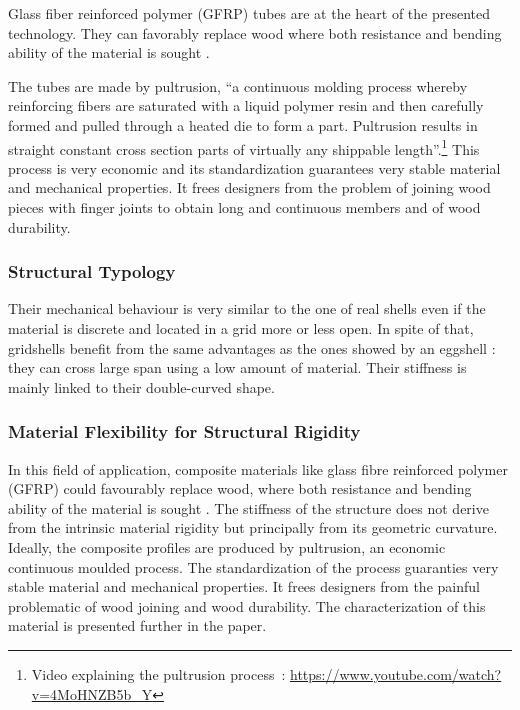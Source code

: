 Glass fiber reinforced polymer (GFRP) tubes are at the heart of the presented technology. They can favorably replace wood where both resistance and bending ability of the material is sought \cite{Douthe2010}. 

The tubes are made by pultrusion, \enquote{a continuous molding process whereby reinforcing fibers are saturated with a liquid polymer resin and then carefully formed and pulled through a heated die to form a part. Pultrusion results in straight constant cross section parts of virtually any shippable length}.\footnote{Video explaining the pultrusion process~: \url{https://www.youtube.com/watch?v=4MoHNZB5b_Y}} This process is very economic and its standardization guarantees very stable material and mechanical properties. It frees designers from the problem of joining wood pieces with finger joints to obtain long and continuous members and of wood durability. 


\subsubsection{Structural Typology}
Their mechanical behaviour is very similar to the one of real shells even if the material is discrete and located in a grid more or less open. In spite of that, gridshells benefit from the same advantages as the ones showed by an eggshell : they can cross large span using a low amount of material. Their stiffness is mainly linked to their double-curved shape.


\subsubsection{Material Flexibility for Structural Rigidity}
In this field of application, composite materials like glass fibre reinforced polymer (GFRP) could favourably replace wood, where both resistance and bending ability of the material is sought \cite{Douthe2010}. The stiffness of the structure does not derive from the intrinsic material rigidity but principally from its geometric curvature. Ideally, the composite profiles are produced by pultrusion, an economic continuous moulded process. The standardization of the process guaranties very stable material and mechanical properties. It frees designers from the painful problematic of wood joining and wood durability. The characterization of this material is presented further in the paper.



